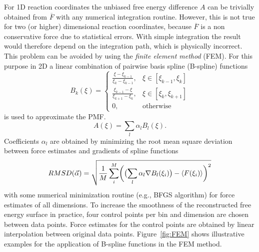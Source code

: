 For 1D reaction coordinates the unbiased free energy difference $A$ can be trivially obtained from $\overline{F}$ with any numerical integration routine.\autocite{davis2007methods}
However, this is not true for two (or higher) dimensional reaction coordinates, because $\overline{F}$ is a non conservative force due to statistical errors.\autocite{comer2015adaptive} With simple integration the result would therefore depend on the integration path, which is physically incorrect. This problem can be avoided by using the \textit{finite element method} (FEM).\autocite{darve2008adaptive} For this purpose in 2D a linear combination of pairwise basis spline (B-spline)\autocite{de1972calculating} functions
\begin{equation}
  B_k(\xi)=\left\{\begin{array}{ll} \frac{\xi-\xi_{k-1}}{\xi_k-\xi_{k-1}}, & \xi \in [\xi_{k-1},\xi_k] \\
                                    \frac{\xi_{k-1}-\xi}{\xi_{k+1}-\xi_{k}}, & \xi \in [\xi_{k},\xi_{k+1}] \\
                                    0, & \text{otherwise}
                  \end{array}\right.
  \label{eq:B spline}
\end{equation}
is used to approximate the PMF.
\begin{equation}
  A(\xi) = \sum_l \alpha_l B_l(\xi). \label{eq:FEM}
\end{equation}
Coefficients $\alpha_l$ are obtained by minimizing the root mean square deviation between force estimates and gradients of spline functions
\begin{equation}
  RMSD(\vec{\alpha})=\sqrt{\frac{1}{M}\sum_i^M\biggl(\bigl(\sum_l \alpha_l \nabla B_l(\xi_i)\bigr) - \braket{F(\xi_i)} \biggr)^2}
  \label{eq:RMSD}
\end{equation}
with some numerical minimization routine (e.g., BFGS algorithm\autocite{nocedal2006numerical}) for force estimates of all dimensions.\autocite{darve2008adaptive} To increase the smoothness of the reconstructed free energy surface in practice, four control points per bin and dimension are chosen between data points. Force estimates for the control points are obtained by linear interpolation between original data points. Figure~\ref{fig:FEM} shows illustrative examples for the application of B-spline functions in the FEM method.

